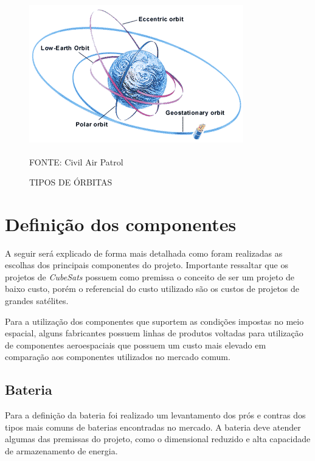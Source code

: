 \documentclass[
	12pt,				%
	openright,			%
	oneside,			%
	a4paper,			%
	english,			%
	french,				%
	spanish,			%
	brazil,				%
	oldfontcommands
	]{abntex2}
\begin{document}
	\begin{figure}[th]
		\caption{TIPOS DE ÓRBITAS}
		\centering
		\includegraphics[width=0.5\linewidth]{./figs/cubesat_03}
			
		\begin{small}
			FONTE: Civil Air Patrol\textsuperscript{\cite{CAP}}
		\end{small}		
	\end{figure}	
	
	\pagebreak
	
	
\section[Definição dos componentes]{Definição dos componentes}

	A seguir será explicado de forma mais detalhada como foram realizadas as escolhas dos principais componentes do projeto. Importante ressaltar que os projetos de \textit{CubeSats} possuem como premissa o conceito de ser um projeto de baixo custo, porém o referencial do custo utilizado são os custos de projetos de grandes satélites.
	
	Para a utilização dos componentes que suportem as condições impostas  no meio espacial, alguns fabricantes possuem linhas de produtos voltadas para utilização de componentes aeroespaciais que possuem um custo mais elevado em comparação aos componentes utilizados no mercado comum.

\subsection[Bateria]{Bateria}

	Para a definição da bateria foi realizado um levantamento dos prós e contras dos tipos mais comuns de baterias encontradas no mercado. A bateria deve atender algumas das premissas do projeto, como o dimensional reduzido e alta capacidade de armazenamento de energia.
	
	\pagebreak
		
\end{document}
